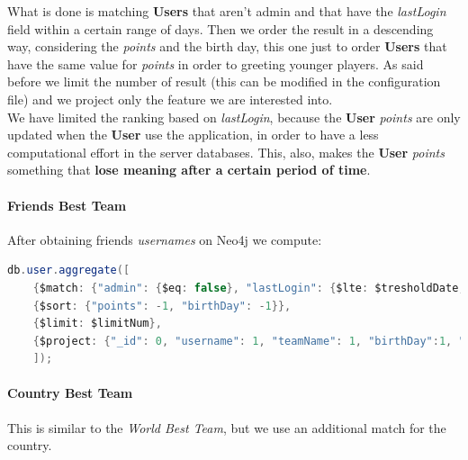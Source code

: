 What is done is matching \textbf{Users} that aren’t admin and that have the \textit{lastLogin} field within a certain range of days. Then we order the result in a descending way, considering the \textit{points} and the birth day, this one just to order \textbf{Users} that have the same value for \textit{points} in order to greeting younger players. As said before we limit the number of result (this can be modified in the configuration file) and we project only the feature we are interested into.\\
We have limited the ranking based on \textit{lastLogin}, because the \textbf{User} \textit{points} are only updated when the \textbf{User} use the application,  in order to have a less computational effort in the server databases. This, also, makes the \textbf{User} \textit{points} something that \textbf{lose meaning after a certain period of time}.

\paragraph{Friends Best Team}
After obtaining friends \textit{usernames} on Neo4j we compute:
\begin{lstlisting}[language=Java]
	db.user.aggregate([
	{$match: {"admin": {$eq: false}, "lastLogin": {$lte: $tresholdDate, "username": {$in: $friendsUsernames}}}},
	{$sort: {"points": -1, "birthDay": -1}},
	{$limit: $limitNum},
	{$project: {"_id": 0, "username": 1, "teamName": 1, "birthDay":1, "country": 1}}
	]);
\end{lstlisting}
\paragraph{Country Best Team}
This is similar to the \textit{World Best Team}, but we use an additional match for the country.


